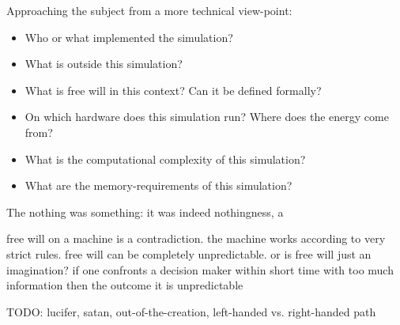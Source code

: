 \documentclass{article}
\begin{document}
Approaching the subject from a more technical view-point:

\begin{itemize}
\item Who or what implemented the simulation?
\item What is outside this simulation?
\item What is free will in this context? Can it be defined formally?
\item On which hardware does this simulation run? Where does the energy come from?
\item What is the computational complexity of this simulation?
\item What are the memory-requirements of this simulation?
\end{itemize}


The nothing was something: it was indeed nothingness, a

free will on a machine is a contradiction. the machine works according to very strict rules. free will can be completely unpredictable. or is free will just an imagination? if one confronts a decision maker within short time with too much information then the outcome it is unpredictable 

TODO: lucifer, satan, out-of-the-creation, left-handed vs. right-handed path
\end{document}
